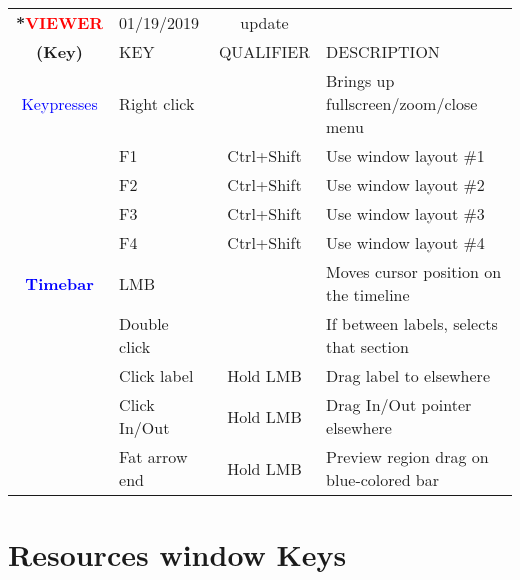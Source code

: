 \begin{center}
    \small 
    \begin{longtable}{ >{\bfseries}c l c p{6cm}}             
        \toprule
        \multirow{2}*{\textcolor{red}{VIEWER}} & 01/19/2019 & update & \\
        \noalign{\smallskip}
        \cline{2-4}
        \noalign{\smallskip}
        (Key) & KEY & QUALIFIER & DESCRIPTION\\
        \midrule        
        \endhead   
        
        \textcolor{blue}{Keypresses} & Right click &  & Brings up fullscreen/zoom/close menu \\
        & F1 & Ctrl+Shift & Use window layout \#1 \\        
        & F2 & Ctrl+Shift & Use window layout \#2 \\        
        & F3 & Ctrl+Shift & Use window layout \#3 \\        
        & F4 & Ctrl+Shift & Use window layout \#4 \\
        \midrule        
        \textcolor{blue}{Timebar} & LMB &  & Moves cursor position on the timeline \\        
        & Double click &  & If between labels, selects that section \\        
        & Click label & Hold LMB & Drag label to elsewhere \\        
        & Click In/Out & Hold LMB & Drag In/Out pointer elsewhere \\        
        & Fat arrow end & Hold LMB & Preview region drag on blue-colored bar \\        
        
        \bottomrule  
    \end{longtable}
\end{center} 

\section{Resources window Keys }%
\label{sec:resources_window_keys}

